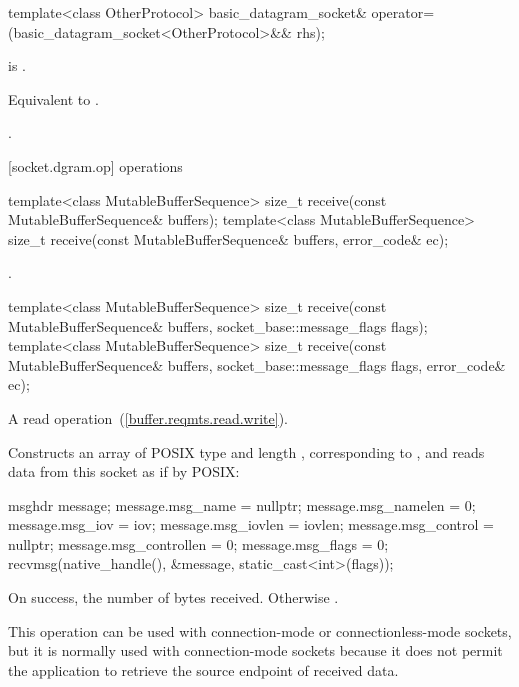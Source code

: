\begin{itemdecl}
template<class OtherProtocol>
  basic_datagram_socket& operator=(basic_datagram_socket<OtherProtocol>&& rhs);
\end{itemdecl}

\begin{itemdescr}
\pnum
\constraints {} is .

\pnum
\effects Equivalent to .

\pnum
\returns {}.
\end{itemdescr}



[socket.dgram.op]{ operations}

\begin{itemdecl}
template<class MutableBufferSequence>
  size_t receive(const MutableBufferSequence& buffers);
template<class MutableBufferSequence>
  size_t receive(const MutableBufferSequence& buffers,
                 error_code& ec);
\end{itemdecl}

\begin{itemdescr}
\pnum
\returns {}.
\end{itemdescr}

\begin{itemdecl}
template<class MutableBufferSequence>
  size_t receive(const MutableBufferSequence& buffers,
                 socket_base::message_flags flags);
template<class MutableBufferSequence>
  size_t receive(const MutableBufferSequence& buffers,
                 socket_base::message_flags flags, error_code& ec);
\end{itemdecl}

\begin{itemdescr}
\pnum
A read operation~(\ref{buffer.reqmts.read.write}).

\pnum
\effects Constructs an array  of POSIX type  and length , corresponding to , and reads data from this socket as if by POSIX:
\begin{codeblock}
msghdr message;
message.msg_name = nullptr;
message.msg_namelen = 0;
message.msg_iov = iov;
message.msg_iovlen = iovlen;
message.msg_control = nullptr;
message.msg_controllen = 0;
message.msg_flags = 0;
recvmsg(native_handle(), &message, static_cast<int>(flags));
\end{codeblock}


\pnum
\returns On success, the number of bytes received. Otherwise .

\pnum
 \begin{note} This operation can be used with connection-mode or connectionless-mode sockets, but it is normally used with connection-mode sockets because it does not permit the application to retrieve the source endpoint of received data. \end{note}
\end{itemdescr}

